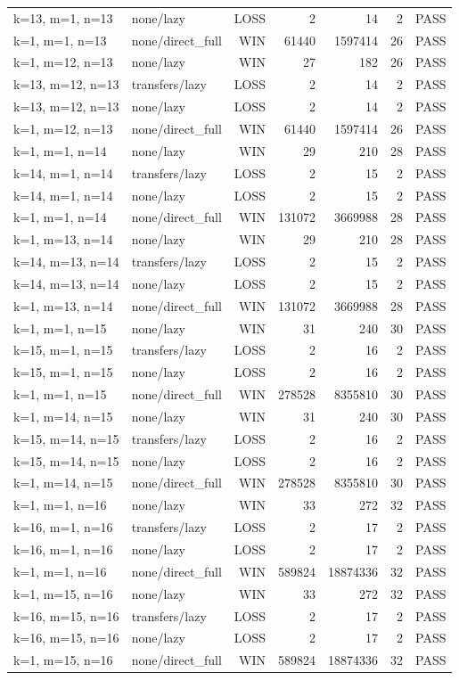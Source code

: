 \begin{longtable}{llrrrrl}
k=13, m=1, n=13 & none/lazy & LOSS & 2 & 14 & 2 & PASS \\
k=1, m=1, n=13 & none/direct\_full & WIN & 61440 & 1597414 & 26 & PASS \\
k=1, m=12, n=13 & none/lazy & WIN & 27 & 182 & 26 & PASS \\
k=13, m=12, n=13 & transfers/lazy & LOSS & 2 & 14 & 2 & PASS \\
k=13, m=12, n=13 & none/lazy & LOSS & 2 & 14 & 2 & PASS \\
k=1, m=12, n=13 & none/direct\_full & WIN & 61440 & 1597414 & 26 & PASS \\
k=1, m=1, n=14 & none/lazy & WIN & 29 & 210 & 28 & PASS \\
k=14, m=1, n=14 & transfers/lazy & LOSS & 2 & 15 & 2 & PASS \\
k=14, m=1, n=14 & none/lazy & LOSS & 2 & 15 & 2 & PASS \\
k=1, m=1, n=14 & none/direct\_full & WIN & 131072 & 3669988 & 28 & PASS \\
k=1, m=13, n=14 & none/lazy & WIN & 29 & 210 & 28 & PASS \\
k=14, m=13, n=14 & transfers/lazy & LOSS & 2 & 15 & 2 & PASS \\
k=14, m=13, n=14 & none/lazy & LOSS & 2 & 15 & 2 & PASS \\
k=1, m=13, n=14 & none/direct\_full & WIN & 131072 & 3669988 & 28 & PASS \\
k=1, m=1, n=15 & none/lazy & WIN & 31 & 240 & 30 & PASS \\
k=15, m=1, n=15 & transfers/lazy & LOSS & 2 & 16 & 2 & PASS \\
k=15, m=1, n=15 & none/lazy & LOSS & 2 & 16 & 2 & PASS \\
k=1, m=1, n=15 & none/direct\_full & WIN & 278528 & 8355810 & 30 & PASS \\
k=1, m=14, n=15 & none/lazy & WIN & 31 & 240 & 30 & PASS \\
k=15, m=14, n=15 & transfers/lazy & LOSS & 2 & 16 & 2 & PASS \\
k=15, m=14, n=15 & none/lazy & LOSS & 2 & 16 & 2 & PASS \\
k=1, m=14, n=15 & none/direct\_full & WIN & 278528 & 8355810 & 30 & PASS \\
k=1, m=1, n=16 & none/lazy & WIN & 33 & 272 & 32 & PASS \\
k=16, m=1, n=16 & transfers/lazy & LOSS & 2 & 17 & 2 & PASS \\
k=16, m=1, n=16 & none/lazy & LOSS & 2 & 17 & 2 & PASS \\
k=1, m=1, n=16 & none/direct\_full & WIN & 589824 & 18874336 & 32 & PASS \\
k=1, m=15, n=16 & none/lazy & WIN & 33 & 272 & 32 & PASS \\
k=16, m=15, n=16 & transfers/lazy & LOSS & 2 & 17 & 2 & PASS \\
k=16, m=15, n=16 & none/lazy & LOSS & 2 & 17 & 2 & PASS \\
k=1, m=15, n=16 & none/direct\_full & WIN & 589824 & 18874336 & 32 & PASS \\
\bottomrule
\end{longtable}
